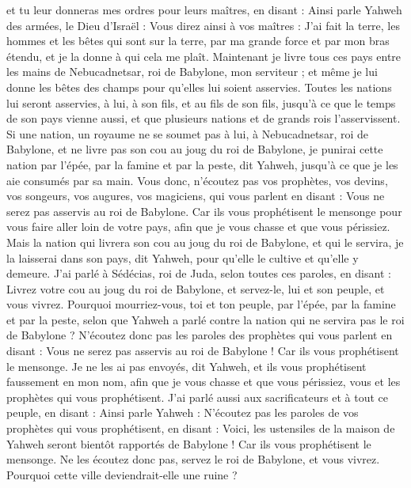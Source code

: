 \begin{multicols}{2}
et tu leur donneras mes ordres pour leurs maîtres, en disant : Ainsi parle Yahweh des armées, le Dieu d'Israël : Vous direz ainsi à vos maîtres :
J'ai fait la terre, les hommes et les bêtes qui sont sur la terre, par ma grande force et par mon bras étendu, et je la donne à qui cela me plaît.
Maintenant je livre tous ces pays entre les mains de Nebucadnetsar, roi de Babylone, mon serviteur ; et même je lui donne les bêtes des champs pour qu'elles lui soient asservies.
Toutes les nations lui seront asservies, à lui, à son fils, et au fils de son fils, jusqu’à ce que le temps de son pays vienne aussi, et que plusieurs nations et de grands rois l'asservissent.
Si une nation, un royaume ne se soumet pas à lui, à Nebucadnetsar, roi de Babylone, et ne livre pas son cou au joug du roi de Babylone, je punirai cette nation par l'épée, par la famine et par la peste, dit Yahweh, jusqu’à ce que je les aie consumés par sa main.
Vous donc, n'écoutez pas vos prophètes, vos devins, vos songeurs, vos augures, vos magiciens, qui vous parlent en disant : Vous ne serez pas asservis au roi de Babylone.
Car ils vous prophétisent le mensonge pour vous faire aller loin de votre pays, afin que je vous chasse et que vous périssiez.
Mais la nation qui livrera son cou au joug du roi de Babylone, et qui le servira, je la laisserai dans son pays, dit Yahweh, pour qu’elle le cultive et qu’elle y demeure.
J’ai parlé à Sédécias, roi de Juda, selon toutes ces paroles, en disant : Livrez votre cou au joug du roi de Babylone, et servez-le, lui et son peuple, et vous vivrez.
Pourquoi mourriez-vous, toi et ton peuple, par l'épée, par la famine et par la peste, selon que Yahweh a parlé contre la nation qui ne servira pas le roi de Babylone ?
N'écoutez donc pas les paroles des prophètes qui vous parlent en disant : Vous ne serez pas asservis au roi de Babylone ! Car ils vous prophétisent le mensonge.
Je ne les ai pas envoyés, dit Yahweh, et ils vous prophétisent faussement en mon nom, afin que je vous chasse et que vous périssiez, vous et les prophètes qui vous prophétisent.
J’ai parlé aussi aux sacrificateurs et à tout ce peuple, en disant : Ainsi parle Yahweh : N'écoutez pas les paroles de vos prophètes qui vous prophétisent, en disant : Voici, les ustensiles de la maison de Yahweh seront bientôt rapportés de Babylone ! Car ils vous prophétisent le mensonge.
Ne les écoutez donc pas, servez le roi de Babylone, et vous vivrez. Pourquoi cette ville deviendrait-elle une ruine ?

\end{multicols}

